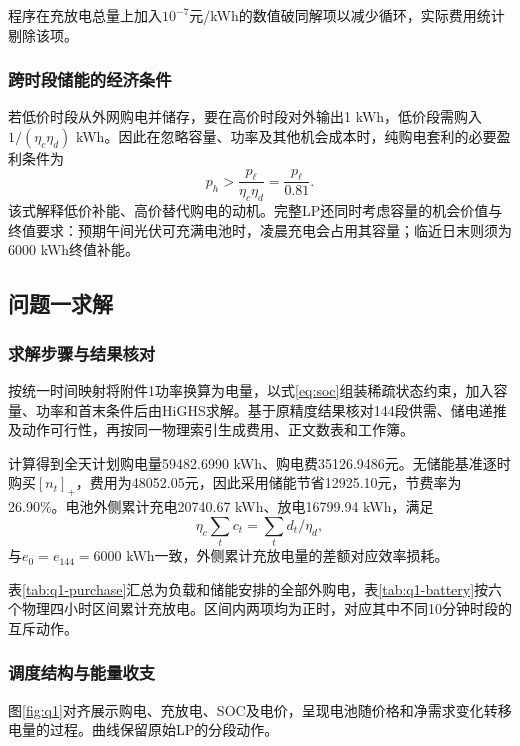 程序在充放电总量上加入$10^{-7}$元/kWh的数值破同解项以减少循环，实际费用统计剔除该项。

\subsubsection{跨时段储能的经济条件}

若低价时段从外网购电并储存，要在高价时段对外输出1 kWh，低价段需购入$1/(\eta_c\eta_d)$ kWh。因此在忽略容量、功率及其他机会成本时，纯购电套利的必要盈利条件为
\begin{equation}
 p_h>\frac{p_\ell}{\eta_c\eta_d}=\frac{p_\ell}{0.81}.
 \label{eq:arbitrage}
\end{equation}
该式解释低价补能、高价替代购电的动机。完整LP还同时考虑容量的机会价值与终值要求：预期午间光伏可充满电池时，凌晨充电会占用其容量；临近日末则须为6000 kWh终值补能。

\subsection{问题一求解}

\subsubsection{求解步骤与结果核对}

按统一时间映射将附件1功率换算为电量，以式\eqref{eq:soc}组装稀疏状态约束，加入容量、功率和首末条件后由HiGHS求解。基于原精度结果核对144段供需、储电递推及动作可行性，再按同一物理索引生成费用、正文数表和工作簿。

计算得到全天计划购电量59482.6990 kWh、购电费35126.9486元。无储能基准逐时购买$[n_t]_+$，费用为48052.05元，因此采用储能节省12925.10元，节费率为26.90\%。电池外侧累计充电20740.67 kWh、放电16799.94 kWh，满足
\[
 \eta_c\sum_tc_t=\sum_td_t/\eta_d,
\]
与$e_0=e_{144}=6000$ kWh一致，外侧累计充放电量的差额对应效率损耗。



表\ref{tab:q1-purchase}汇总为负载和储能安排的全部外购电，表\ref{tab:q1-battery}按六个物理四小时区间累计充放电。区间内两项均为正时，对应其中不同10分钟时段的互斥动作。

\subsubsection{调度结构与能量收支}

图\ref{fig:q1}对齐展示购电、充放电、SOC及电价，呈现电池随价格和净需求变化转移电量的过程。曲线保留原始LP的分段动作。

